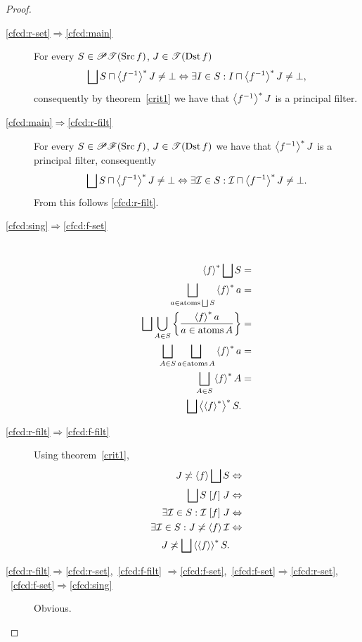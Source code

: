 \begin{proof}
~
\begin{description}
\item [{\ref{cfcd:r-set}$\Rightarrow$\ref{cfcd:main}}] For every
$S\in\mathscr{P}\mathscr{T}(\operatorname{Src} f)$,
$J\in\mathscr{T}(\operatorname{Dst} f)$
\[
\bigsqcup S\sqcap\rsupfun{f^{-1}}J\ne\bot\Leftrightarrow\exists I\in
S:I\sqcap\rsupfun{f^{-1}}J\ne\bot,
\]
consequently by theorem~\ref{crit1} we have that $\left\langle f^{-1}\right\rangle ^{\ast}J$
is a principal filter.
\item [{\ref{cfcd:main}$\Rightarrow$\ref{cfcd:r-filt}}] For every
$S\in\mathscr{P}\mathscr{F}(\operatorname{Src} f)$,
$J\in\mathscr{T}(\operatorname{Dst} f)$ we have that $\left\langle f^{-1}\right\rangle ^{\ast}J$ is a
principal filter, consequently
\[
\bigsqcup S\sqcap\rsupfun{f^{-1}}J\ne\bot \Leftrightarrow\exists\mathcal{I}\in
S:\mathcal{I}\sqcap\rsupfun{f^{-1}}J\ne\bot.
\]
From this follows \ref{cfcd:r-filt}.
\item [{\ref{cfcd:sing}$\Rightarrow$\ref{cfcd:f-set}}] ~
\begin{align*}
\rsupfun f\bigsqcup S & =\\
\bigsqcup_{a\in\atoms\bigsqcup S}\rsupfun fa & =\\
\bigsqcup\bigcup_{A\in S}\setcond{\rsupfun fa}{a\in\atoms A} & =\\
\bigsqcup_{A\in S}\bigsqcup_{a\in\atoms A}\rsupfun fa & =\\
\bigsqcup_{A\in S}\rsupfun fA & =\\
\bigsqcup\rsupfun{\rsupfun f}S.
\end{align*}

\item [{\ref{cfcd:r-filt}$\Rightarrow$\ref{cfcd:f-filt}}] Using
theorem~\ref{crit1},
\begin{align*}
J\nasymp\supfun f\bigsqcup S & \Leftrightarrow\\
\bigsqcup S\suprel fJ & \Leftrightarrow\\
\exists\mathcal{I}\in S:\mathcal{I}\suprel fJ & \Leftrightarrow\\
\exists\mathcal{I}\in S:J\nasymp\supfun f\mathcal{I} & \Leftrightarrow\\
J\nasymp\bigsqcup\rsupfun{\supfun f}S.
\end{align*}

\item
[{\ref{cfcd:r-filt}$\Rightarrow$\ref{cfcd:r-set},~\ref{cfcd:f-filt}
$\Rightarrow$\ref{cfcd:f-set},~\ref{cfcd:f-set}$\Rightarrow$\ref{cfcd:r-set},
~\ref{cfcd:f-set}$\Rightarrow$\ref{cfcd:sing}}] Obvious.
\end{description}
\end{proof}
